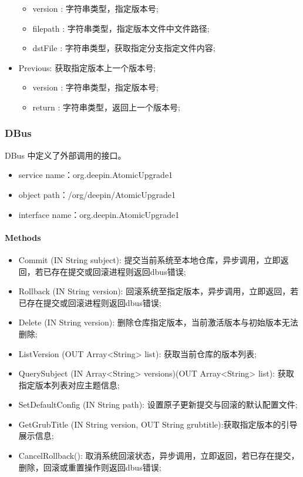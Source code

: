 \documentclass{utart}
\begin{document}
\begin{itemize}[leftmargin=4em]
\begin{itemize}[leftmargin=4em]
    \item version : 字符串类型，指定版本号;
    \item filepath : 字符串类型，指定版本文件中文件路径;
    \item dstFile : 字符串类型，获取指定分支指定文件内容;
  \end{itemize}
  \item Previous: 获取指定版本上一个版本号;
  \begin{itemize}[leftmargin=4em]
    \item version : 字符串类型，指定版本号;
    \item return : 字符串类型，返回上一个版本号;
  \end{itemize}
\end{itemize}

\subsubsection{DBus}
DBus 中定义了外部调用的接口。
\begin{itemize}[leftmargin=4em]
  \item service name：org.deepin.AtomicUpgrade1
  \item object path：/org/deepin/AtomicUpgrade1
  \item interface name：org.deepin.AtomicUpgrade1
\end{itemize}

\paragraph{Methods}
\begin{itemize}[leftmargin=4em]
  \item Commit (IN String  subject): 提交当前系统至本地仓库，异步调用，立即返回，若已存在提交或回滚进程则返回dbus错误;
  \item Rollback (IN String  version): 回滚系统至指定版本，异步调用，立即返回，若已存在提交或回滚进程则返回dbus错误;
  \item Delete (IN String  version): 删除仓库指定版本，当前激活版本与初始版本无法删除;
  \item ListVersion (OUT Array<String> list): 获取当前仓库的版本列表;
  \item QuerySubject (IN Array<String> versions)(OUT Array<String> list): 获取指定版本列表对应主题信息;
  \item SetDefaultConfig (IN String  path): 设置原子更新提交与回滚的默认配置文件;
  \item GetGrubTitle (IN String  version, OUT String  grubtitle):获取指定版本的引导展示信息;
  \item CancelRollback(): 取消系统回滚状态，异步调用，立即返回，若已存在提交，删除，回滚或重置操作则返回dbus错误;
\end{itemize}
\end{document}

